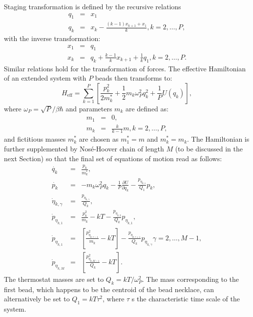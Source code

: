 \documentclass[12pt,a4paper]{article}
\begin{document}
Staging transformation is defined by the recursive relations 
\begin{eqnarray}
q_1&=&x_1 \nonumber \\
q_k&=&x_k - \frac{(k-1)x_{k+1}+x_1}{k},   k=2,\dots,P ,
\end{eqnarray}
with the inverse transformation:
\begin{eqnarray}
x_1&=&q_1 \nonumber \\
x_k&=&q_k+\frac{k-1}{k}x_{k+1}+\frac{1}{k}q_1,   k=2,\dots,P .
\end{eqnarray}
Similar relations hold for the transformation of forces.
The effective Hamiltonian of an extended system with $P$ beads  %
then transforms to: 
\begin{equation}
H_{\mathrm{eff}}= \sum^P_{k=1}\left[\frac{p_k^2}{2m^*_k} + \frac{1}{2}m_k\omega_P^2 q_k^2+\frac{1}{P}U(q_k)\right]  ,
\end{equation}
where $\omega_P=\sqrt{P}/\beta\hbar$ and parameters $m_k$ are defined as:
\begin{eqnarray}
m_1 &=& 0, \\
m_k &=& \frac{k}{k-1}m,   k=2,\dots ,P ,
\end{eqnarray}
and fictitious masses $m_k^*$ are chosen as $m^*_1=m$ and $m_k^*=m_k$. The Hamiltonian is further supplemented by Nosé-Hoover chain of length $M$ (to be discussed in the next Section) so that the final set of equations of motion read as follows:
\begin{subequations}
\label{eqPIMDfull}
\begin{eqnarray}
\dot{q_k}&=&\frac{p_k}{m_k^{*}}  ,\\
\dot{p_k}&=&-m_k\omega^2_P q_k - \frac{1}{P}\frac{\partial U}{\partial q_k} - \frac{p_{\eta_{k,1}}}{Q_1}p_k  , \\
\dot{\eta}_{k,\gamma}&=&\frac{p_{\eta_{k, \gamma}}}{Q_k}   ,\\
\label{eqNHC1}
\dot{p}_{\eta_{k,1}}&=&\frac{p_k^2}{m_k^{}}-kT-\frac{p_{\eta_{k,2}}}{Q_k}p_{\eta_{k,1}}   ,\\
\dot{p}_{\eta_{k,1}}&=&\left[\frac{p_{\eta_{k,\gamma-1}}^2}{m_k^{}}-kT\right]-\frac{p_{\eta_{k,\gamma+1}}}{Q_k}p_{\eta_{k,\gamma}}   \gamma = 2,\dots ,M-1   , \\
\dot{p}_{\eta_{k,M}}&=&\left[\frac{p_{\eta_{k,M-1}}^2}{Q_k}-kT\right]  .
\end{eqnarray}
\end{subequations}
The thermostat masses are set to $Q_k=kT/\omega^2_P$. The mass corresponding to the first bead, which happens to be the centroid of the bead necklace, can alternatively be set to $Q_1=kT\tau^2$, where $\tau$ s the characteristic time scale of the system.
  
\end{document}
